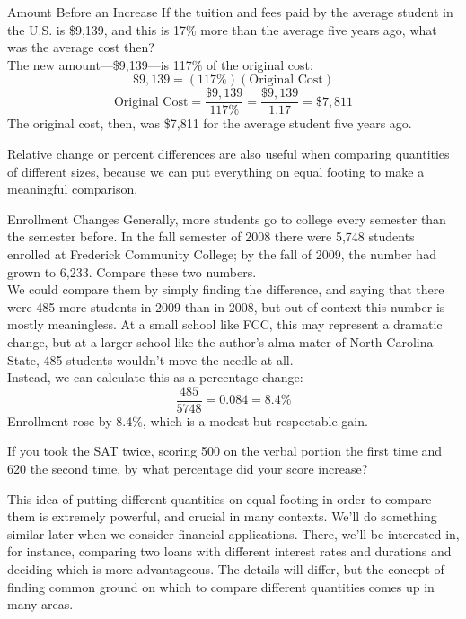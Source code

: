 \begin{example}[https://www.youtube.com/watch?v=gB3RqkMzDDE]{Amount Before an Increase}
If the tuition and fees paid by the average student in the U.S. is \$9,139, and this is 17\% more than the average five years ago, what was the average cost then?\\

The new amount---\$9,139---is 117\% of the original cost:
\[\$9,139 = (117\%)(\textrm{Original Cost})\]
\[\textrm{Original Cost} = \dfrac{\$9,139}{117\%} = \dfrac{\$9,139}{1.17} = \$7,811\]
The original cost, then, was \$7,811 for the average student five years ago.
\end{example}

Relative change or percent differences are also useful when comparing quantities of different sizes, because we can put everything on equal footing to make a meaningful comparison.

\begin{example}[https://www.youtube.com/watch?v=yQmIyPZefK0]{Enrollment Changes}
Generally, more students go to college every semester than the semester before.  In the fall semester of 2008 there were 5,748 students enrolled at Frederick Community College; by the fall of 2009, the number had grown to 6,233.  Compare these two numbers.\\

We could compare them by simply finding the difference, and saying that there were 485 more students in 2009 than in 2008, but out of context this number is mostly meaningless.  At a small school like FCC, this may represent a dramatic change, but at a larger school like the author's alma mater of North Carolina State, 485 students wouldn't move the needle at all.\\

Instead, we can calculate this as a percentage change:
\[\dfrac{485}{5748} = 0.084 = 8.4\%\]
Enrollment rose by 8.4\%, which is a modest but respectable gain.
\end{example}

\begin{try}
If you took the SAT twice, scoring 500 on the verbal portion the first time and 620 the second time, by what percentage did your score increase?
\end{try}

This idea of putting different quantities on equal footing in order to compare them is extremely powerful, and crucial in many contexts.  We'll do something similar later when we consider financial applications.  There, we'll be interested in, for instance, comparing two loans with different interest rates and durations and deciding which is more advantageous.  The details will differ, but the concept of finding common ground on which to compare different quantities comes up in many areas.\\

